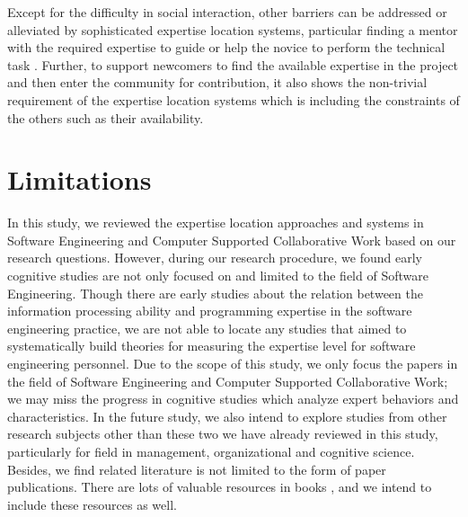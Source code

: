 Except for the difficulty in social interaction, other barriers can be addressed or alleviated by sophisticated expertise location systems, particular finding a mentor with the required expertise to guide or help the novice to perform the technical task \cite{begel2008novice}. Further, to support newcomers to find the available expertise in the project and then enter the community for contribution, it also shows the non-trivial requirement of the expertise location systems which is including the constraints of the others such as their availability.


\section{Limitations}

In this study, we reviewed the expertise location approaches and systems in Software Engineering and Computer Supported Collaborative Work based on our research questions. However, during our research procedure, we found early cognitive studies are not only focused on and limited to the field of Software Engineering. Though there are early studies about the relation between the information processing ability and programming expertise in the software engineering practice, we are not able to locate any studies that aimed to systematically build theories for measuring the expertise level for software engineering personnel. Due to the scope of this study, we only focus the papers in the field of Software Engineering and Computer Supported Collaborative Work; we may miss the progress in cognitive studies which analyze expert behaviors and characteristics. In the future study, we also intend to explore studies from other research subjects other than these two we have already reviewed in this study, particularly for field in management, organizational and cognitive science. Besides, we find related literature is not limited to the form of paper publications. There are lots of valuable resources in books \cite{ericsson2006cambridge, Simon:1996:SA:237774}, and we intend to include these resources as well.